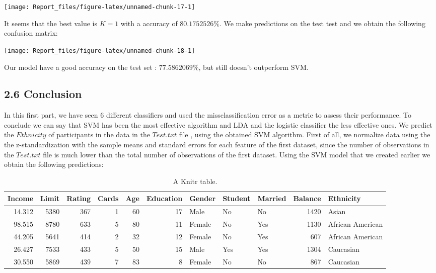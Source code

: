 \documentclass[]{article}
\begin{document}
\begin{center}\texttt{[image: Report\_files/figure-latex/unnamed-chunk-17-1]} \end{center}

It seems that the best value is \(K=1\) with a accuracy of
\(80.1752526\%\). We make predictions on the test test and we obtain the
following confusion matrix:

\begin{center}\texttt{[image: Report\_files/figure-latex/unnamed-chunk-18-1]} \end{center}

Our model have a good accuracy on the test set : \(77.5862069\%\), but
still doesn't outperform SVM.

\subsection{2.6 Conclusion}\label{conclusion}

In this first part, we have seen \(6\) different classifiers and used
the missclassification error as a metric to assess their performance. To
conclude we can say that SVM has been the most effective algorithm and
LDA and the logistic classifier the less effective ones. We predict the
\(Ethnicity\) of participants in the data in the \(Test.txt\) file ,
using the obtained SVM algorithm. First of all, we normalize data using
the the z-standardization with the sample means and standard errors for
each feature of the first dataset, since the number of observations in
the \(Test.txt\) file is much lower than the total number of
observations of the first dataset. Using the SVM model that we created
earlier we obtain the following predictions:

\begin{table}

\caption{\label{tab:unnamed-chunk-19}A Knitr table.}
\centering
\begin{tabular}[t]{r|r|r|r|r|r|l|l|l|r|l}
\hline
Income & Limit & Rating & Cards & Age & Education & Gender & Student & Married & Balance & Ethnicity\\
\hline
14.312 & 5380 & 367 & 1 & 60 & 17 & Male & No & No & 1420 & Asian\\
\hline
98.515 & 8780 & 633 & 5 & 80 & 11 & Female & No & Yes & 1130 & African American\\
\hline
44.205 & 5641 & 414 & 2 & 32 & 12 & Female & No & Yes & 607 & African American\\
\hline
26.427 & 7533 & 433 & 5 & 50 & 15 & Male & Yes & Yes & 1304 & Caucasian\\
\hline
30.550 & 5869 & 439 & 7 & 83 & 8 & Female & No & No & 867 & Caucasian\\
\hline
\end{tabular}
\end{table}
\end{document}
